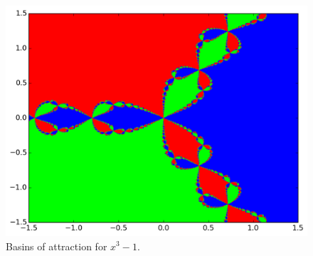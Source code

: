 \begin{problem}
\begin{enumerate}
\end{enumerate}
\begin{figure}[H]
\begin{center}
\includegraphics[scale=0.66]{fractal_hw}
\caption{Basins of attraction for $x^3-1$.}
\label{fig:fractal_hw}
\end{center}
\end{figure}
\end{problem}

